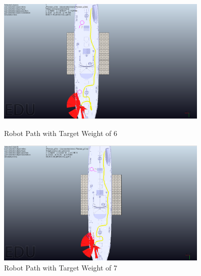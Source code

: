 \begin{figure}[h]
    \centering
    \begin{minipage}{1.0\textwidth}
        \centering
        \includegraphics[width=0.9\textwidth]{Figures/TW-6.PNG} %
        \caption{Robot Path with Target Weight of 6}
        \label{fig:Robot Path with Target Weight of 6}    
    \end{minipage}\hfill
    \begin{minipage}{1.0\textwidth}
        \centering
        \includegraphics[width=0.9\textwidth]{Figures/TW-7.PNG} 
        \caption{Robot Path with Target Weight of 7} 
        \label{fig:Robot Path with Target Weight of 7}
    \end{minipage}
\end{figure}

